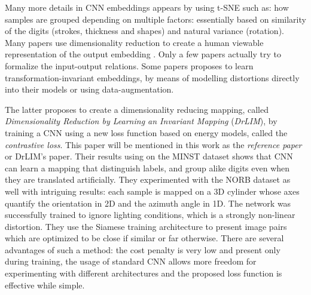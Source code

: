 \documentclass[a4paper,12pt]{report}
\begin{document}
Many more details in CNN embeddings appears by using t-SNE such as: how samples are grouped depending on multiple factors: essentially based on similarity of the digits (strokes, thickness and shapes) and natural variance (rotation).
Many papers use dimensionality reduction to create a human viewable representation of the output embedding \cite{donahue2013decaf}\cite{yu2014visualizing}\cite{yaotiny}.
Only a few papers actually try to formalize the input-output relations\cite{goodfellow2009measuring}.
Some papers proposes to learn transformation-invariant embeddings, by means of modelling distortions directly into their models\cite{gens2014deep} or using data-augmentation\cite{hadsell2006dimensionality}.

The latter proposes to create a dimensionality reducing mapping, called {\em Dimensionality Reduction by Learning an Invariant Mapping} ({\em DrLIM}), by training a CNN using a new loss function based on energy models, called the {\em contrastive loss}.
This paper will be mentioned in this work as the {\em reference paper} or DrLIM's paper.
Their results using on the MINST dataset\cite{lecun1998mnist} shows that CNN can learn a mapping that distinguish labels, and group alike digits even when they are translated artificially.
They experimented with the NORB dataset\cite{lecun2004learning} as well with intriguing results: each sample is mapped on a 3D cylinder whose axes quantify the orientation in 2D and the azimuth angle in 1D.
The network was successfully trained to ignore lighting conditions, which is a strongly non-linear distortion.
They use the Siamese training architecture to present image pairs which are optimized to be close if similar or far otherwise\cite{bromley1993signature}\cite{chopra2005learning}.
There are several advantages of such a method: the cost penalty is very low and present only during training, the usage of standard CNN allows more freedom for experimenting with different architectures and the proposed loss function is effective while simple.
\end{document}
